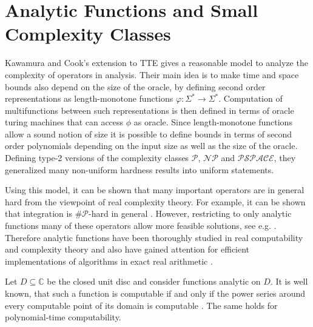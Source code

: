 \documentclass{article}
\newcommand{\CC}{\mathbb C}
\newcommand{\p}{\ensuremath{\mathcal P}\xspace}
\newcommand{\np}{\ensuremath{\mathcal{NP}}\xspace}
\newcommand{\sharpp}{\ensuremath{\# \mathcal{P}}\xspace}
\newcommand{\pspace}{\ensuremath{ \mathcal{PSPACE}}\xspace}
\begin{document}
\section*{Analytic Functions and Small Complexity Classes}
Kawamura and Cook's extension to TTE \cite{AkiACM} gives a reasonable model to  analyze the complexity of operators in analysis.
Their main idea is to make time and space bounds also depend on the size of the oracle, by defining second order representations as length-monotone functions $\varphi: \Sigma^* \to \Sigma^*$.
Computation of multifunctions between such representations is then defined in terms of oracle turing machines that can access $\phi$ as oracle.
Since length-monotone functions allow a sound notion of size it is possible to define bounds in terms of second order polynomials depending on the input size as well as the size of the oracle.
Defining type-2 versions of the complexity classes \p, \np and \pspace, they generalized many non-uniform hardness results into uniform statements.

Using this model, it can be shown that many important operators are in general hard from the viewpoint of real complexity theory. 
For example, it can be shown that integration is \sharpp-hard in general \cite{MR748898,AkiACM}.
However, restricting to only analytic functions many of these operators allow more feasible solutions, see e.g. \cite{MR1137517, Kawamura2012}.  
Therefore analytic functions have been thoroughly studied in real computability and complexity theory and also have gained attention for efficient implementations of algorithms in exact real arithmetic \cite{DBLP:journals/corr/abs-1006-0401}.

Let $D \subseteq \CC$ be the closed unit disc and consider functions analytic on $D$.
It is well known, that such a function is computable if and only if the power series around every computable point of its domain is computable \cite{MR1005942}.
The same holds for polynomial-time computability. 
\end{document}
